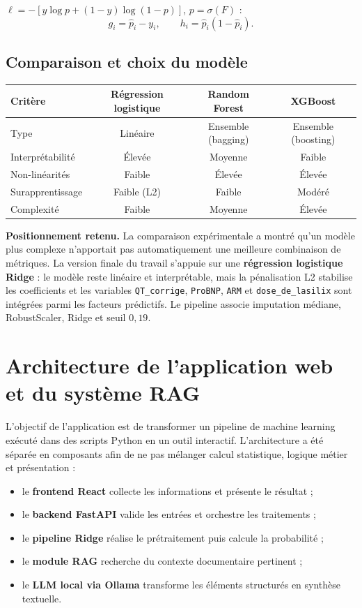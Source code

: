 \documentclass[12pt,a4paper]{report}
\newcommand{\sigmoid}{\sigma}
\begin{document}
$\ell = -[y\log p + (1-y)\log(1-p)]$, $p = \sigmoid(F)$ :
\begin{equation}
 g_i = \hat{p}_i - y_i, \qquad h_i = \hat{p}_i(1-\hat{p}_i).
\end{equation}

\subsection{Comparaison et choix du modèle}

\begin{center}
\renewcommand{\arraystretch}{1.25}
\begin{tabular}{@{}l c c c@{}}
\toprule
\textbf{Critère} & \textbf{Régression logistique} & \textbf{Random Forest} & \textbf{XGBoost}
\\
\midrule
Type & Linéaire & Ensemble (bagging) & Ensemble (boosting) \\
Interprétabilité & Élevée & Moyenne & Faible \\
Non-linéarités & Faible & Élevée & Élevée \\
Surapprentissage & Faible (L2) & Faible & Modéré \\
Complexité & Faible & Moyenne & Élevée \\
\bottomrule
\end{tabular}
\end{center}

\textbf{Positionnement retenu.} La comparaison expérimentale a montré qu'un modèle plus
complexe n'apportait pas automatiquement une meilleure combinaison de métriques. La version
finale du travail s'appuie sur une \textbf{régression logistique Ridge} : le modèle reste linéaire et interprétable, mais la pénalisation L2 stabilise les coefficients et les variables \texttt{QT\_corrige}, \texttt{ProBNP}, \texttt{ARM} et \texttt{dose\_de\_lasilix} sont intégrées parmi les facteurs prédictifs. Le pipeline associe imputation médiane, RobustScaler, Ridge et seuil $0{,}19$.

\section{Architecture de l'application web et du système RAG}

L'objectif de l'application est de transformer un pipeline de machine learning exécuté dans
des scripts Python en un outil interactif. L'architecture a été séparée en composants afin
de ne pas mélanger calcul statistique, logique métier et présentation :
\begin{itemize}[leftmargin=1.5em]
 \item le \textbf{frontend React} collecte les informations et présente le résultat ;
 \item le \textbf{backend FastAPI} valide les entrées et orchestre les traitements ;
 \item le \textbf{pipeline Ridge} réalise le prétraitement puis calcule la probabilité ;
 \item le \textbf{module RAG} recherche du contexte documentaire pertinent ;
 \item le \textbf{LLM local via Ollama} transforme les éléments structurés en synthèse textuelle.
\end{itemize}
\end{document}
